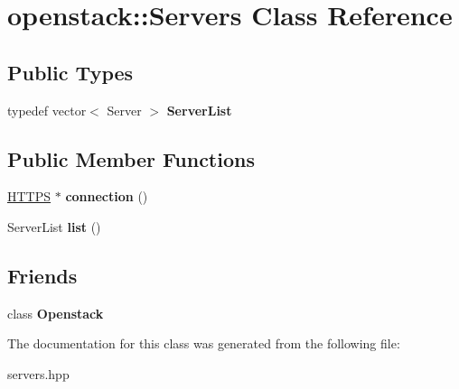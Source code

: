 \hypertarget{classopenstack_1_1Servers}{
\section{openstack::Servers Class Reference}
\label{classopenstack_1_1Servers}
}
\subsection*{Public Types}
\begin{DoxyCompactItemize}
\item 
\hypertarget{classopenstack_1_1Servers_aa70db2a459e7754dcabc9ab2895ab61a}{
typedef vector$<$ Server $>$ {\bfseries ServerList}}
\label{classopenstack_1_1Servers_aa70db2a459e7754dcabc9ab2895ab61a}

\end{DoxyCompactItemize}
\subsection*{Public Member Functions}
\begin{DoxyCompactItemize}
\item 
\hypertarget{classopenstack_1_1Servers_af625fb9e0932322dd17ff3aa876f7065}{
\hyperlink{classopenstack_1_1HTTPS}{HTTPS} $\ast$ {\bfseries connection} ()}
\label{classopenstack_1_1Servers_af625fb9e0932322dd17ff3aa876f7065}

\item 
\hypertarget{classopenstack_1_1Servers_ae4f8fe1f4dd16b8eacdfc9b7f44cf981}{
ServerList {\bfseries list} ()}
\label{classopenstack_1_1Servers_ae4f8fe1f4dd16b8eacdfc9b7f44cf981}

\end{DoxyCompactItemize}
\subsection*{Friends}
\begin{DoxyCompactItemize}
\item 
\hypertarget{classopenstack_1_1Servers_a58e01d02fe556a89795cf7624a7a8405}{
class {\bfseries Openstack}}
\label{classopenstack_1_1Servers_a58e01d02fe556a89795cf7624a7a8405}

\end{DoxyCompactItemize}


The documentation for this class was generated from the following file:\begin{DoxyCompactItemize}
\item 
servers.hpp\end{DoxyCompactItemize}
